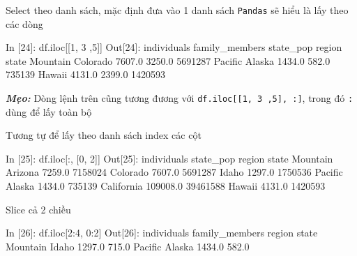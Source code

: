 \documentclass[
]{book}
\makeatletter
\newenvironment{Shaded}{\begin{snugshade}}{\end{snugshade}}
\newcommand{\DecValTok}[1]{\textcolor[rgb]{0.00,0.00,0.81}{#1}}
\newcommand{\FloatTok}[1]{\textcolor[rgb]{0.00,0.00,0.81}{#1}}
\newcommand{\NormalTok}[1]{#1}
\newenvironment{kframe}{%
\medskip{}
\setlength{\fboxsep}{.8em}
 \def\at@end@of@kframe{}%
 \ifinner\ifhmode%
  \def\at@end@of@kframe{\end{minipage}}%
  \begin{minipage}{\columnwidth}%
 \fi\fi%
 \def\FrameCommand##1{\hskip\@totalleftmargin \hskip-\fboxsep
 \colorbox{shadecolor}{##1}\hskip-\fboxsep
     \hskip-\linewidth \hskip-\@totalleftmargin \hskip\columnwidth}%
 \MakeFramed {\advance\hsize-\width
   \@totalleftmargin\z@ \linewidth\hsize
   \@setminipage}}%
 {\par\unskip\endMakeFramed%
 \at@end@of@kframe}
\newenvironment{rmdblock}[1]
  {
  \begin{itemize}
  \renewcommand{\labelitemi}{
    \raisebox{-.7\height}[0pt][0pt]{
      {\setkeys{Gin}{width=3em,keepaspectratio}\texttt{[image: images/\#1]}}
    }
  }
  \setlength{\fboxsep}{1em}
  \begin{kframe}
  \item
  }
  {
  \end{kframe}
  \end{itemize}
  }
\newenvironment{rmdtip}
  {\begin{rmdblock}{tip}}
  {\end{rmdblock}}
\makeatother
\begin{document}
Select theo danh sách, mặc định đưa vào 1 danh sách \texttt{Pandas} sẽ hiểu là lấy theo các dòng

\begin{Shaded}
\begin{Highlighting}[]
\NormalTok{In [}\DecValTok{24}\NormalTok{]: df.iloc[[}\DecValTok{1}\NormalTok{, }\DecValTok{3}\NormalTok{ ,}\DecValTok{5}\NormalTok{]]}
\NormalTok{Out[}\DecValTok{24}\NormalTok{]:}
\NormalTok{                   individuals  family\_members  state\_pop}
\NormalTok{region   state                                           }
\NormalTok{Mountain Colorado       }\FloatTok{7607.0}          \FloatTok{3250.0}    \DecValTok{5691287}
\NormalTok{Pacific  Alaska         }\FloatTok{1434.0}           \FloatTok{582.0}     \DecValTok{735139}
\NormalTok{         Hawaii         }\FloatTok{4131.0}          \FloatTok{2399.0}    \DecValTok{1420593}
\end{Highlighting}
\end{Shaded}

\begin{rmdtip}
\textbf{\emph{Mẹo:}}
Dòng lệnh trên cũng tương đương với \texttt{df.iloc{[}{[}1,\ 3\ ,5{]},\ :{]}}, trong đó \texttt{:} dùng để lấy toàn bộ
\end{rmdtip}
Tương tự để lấy theo danh sách index các cột

\begin{Shaded}
\begin{Highlighting}[]
\NormalTok{In [}\DecValTok{25}\NormalTok{]: df.iloc[:, [}\DecValTok{0}\NormalTok{, }\DecValTok{2}\NormalTok{]]}
\NormalTok{Out[}\DecValTok{25}\NormalTok{]:}
\NormalTok{                     individuals  state\_pop}
\NormalTok{region   state                             }
\NormalTok{Mountain Arizona          }\FloatTok{7259.0}    \DecValTok{7158024}
\NormalTok{         Colorado         }\FloatTok{7607.0}    \DecValTok{5691287}
\NormalTok{         Idaho            }\FloatTok{1297.0}    \DecValTok{1750536}
\NormalTok{Pacific  Alaska           }\FloatTok{1434.0}     \DecValTok{735139}
\NormalTok{         California     }\FloatTok{109008.0}   \DecValTok{39461588}
\NormalTok{         Hawaii           }\FloatTok{4131.0}    \DecValTok{1420593}
\end{Highlighting}
\end{Shaded}

Slice cả 2 chiều

\begin{Shaded}
\begin{Highlighting}[]
\NormalTok{In [}\DecValTok{26}\NormalTok{]: df.iloc[}\DecValTok{2}\NormalTok{:}\DecValTok{4}\NormalTok{, }\DecValTok{0}\NormalTok{:}\DecValTok{2}\NormalTok{]}
\NormalTok{Out[}\DecValTok{26}\NormalTok{]:}
\NormalTok{                 individuals  family\_members}
\NormalTok{region   state                              }
\NormalTok{Mountain Idaho        }\FloatTok{1297.0}           \FloatTok{715.0}
\NormalTok{Pacific  Alaska       }\FloatTok{1434.0}           \FloatTok{582.0}
\end{Highlighting}
\end{Shaded}
\end{document}
